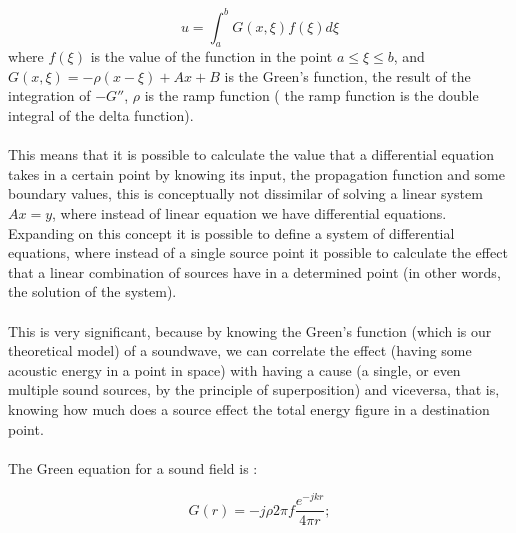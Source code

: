 \[ u=\int_{a}^{b} G(x,\xi)f(\xi)d\xi\]
where $f(\xi)$ is the value of the function in the point 
$ a \le \xi \le b $, and
\\
$G(x,\xi) = - \rho(x - \xi) + Ax + B$ is the Green's function, the result of the integration of $-G''$, $\rho$ is the ramp function ( the ramp function is the double integral of the delta function).
\\
\\
This means that it is possible to calculate the value that a differential equation takes in a certain point by knowing its input, the propagation function and some boundary values, this is conceptually not dissimilar of solving a linear system $Ax=y$, where instead of linear equation we have differential equations.
\\
Expanding on this concept it is possible to define a system of differential equations, where instead of a single source point it possible to calculate the effect that a linear combination of sources have in a determined point (in other words, the solution of the system).
\\
\\
This is very significant, because by knowing the Green's function (which is our theoretical model) of a soundwave, we can correlate the effect (having some acoustic energy in a point in space) with having a cause (a single, or even multiple sound sources, by the principle of superposition) and viceversa, that is, knowing how much does a source effect the total energy figure in a destination point.
\\
\\
The Green equation for a sound field is \parencite{elliott_robustness_2012,kuttruff_room_2014,shin_maximization_2010}:

\begin{equation}
G(r)=-j \rho 2 \pi f \frac{e^{-j k r}}{4 \pi r};
\label{eqn:green}
\end{equation}

